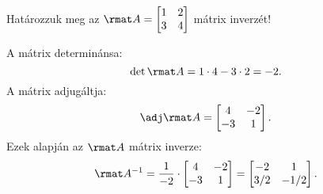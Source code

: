 \documentclass[a4paper, 12pt]{scrartcl}
\begin{document}
\begin{example}
  Határozzuk meg az $\rmat A = \begin{bmatrix}
      1 & 2 \\
      3 & 4
    \end{bmatrix}$ mátrix inverzét!

  A mátrix determinánsa:
  $$
    \det \rmat A = 1 \cdot 4 - 3 \cdot 2 = -2
    \text.
  $$
  A mátrix adjugáltja:
  $$
    \adj \rmat A = \begin{bmatrix}
      4  & -2 \\
      -3 & 1
    \end{bmatrix}
    \text.
  $$
  Ezek alapján az $\rmat A$ mátrix inverze:
  $$
    \rmat A^{-1} = \frac{1}{-2} \cdot \begin{bmatrix}
      4  & -2 \\
      -3 & 1
    \end{bmatrix}
    = \begin{bmatrix}
      -2  & 1    \\
      3/2 & -1/2
    \end{bmatrix}
    \text.
  $$
\end{example}
\end{document}
